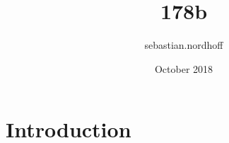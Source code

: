 \documentclass{article}
\title{178b}
\author{sebastian.nordhoff }
\date{October 2018}
\begin{document}
\maketitle

\section{Introduction}
\end{document}

